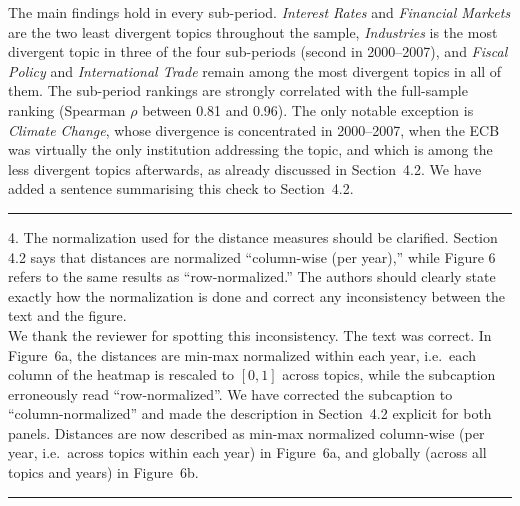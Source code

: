 \documentclass{report}
\theoremstyle{plain}
\begin{document}
{The main findings hold in every sub-period. \textit{Interest Rates} and \textit{Financial Markets} are the two least divergent topics throughout the sample, \textit{Industries} is the most divergent topic in three of the four sub-periods (second in 2000--2007), and \textit{Fiscal Policy} and \textit{International Trade} remain among the most divergent topics in all of them. The sub-period rankings are strongly correlated with the full-sample ranking (Spearman $\rho$ between 0.81 and 0.96). The only notable exception is \textit{Climate Change}, whose divergence is concentrated in 2000--2007, when the ECB was virtually the only institution addressing the topic, and which is among the less divergent topics afterwards, as already discussed in Section~4.2. We have added a sentence summarising this check to Section~4.2.
}
\\
\noindent\rule{15cm}{0.4pt}

4. The normalization used for the distance measures should be clarified. Section 4.2 says that distances are normalized ``column-wise (per year),'' while Figure 6 refers to the same results as ``row-normalized.'' The authors should clearly state exactly how the normalization is done and correct any inconsistency between the text and the figure.
\\
{\color{orange}
We thank the reviewer for spotting this inconsistency. The text was correct. In Figure~6a, the distances are min-max normalized within each year, i.e.\ each column of the heatmap is rescaled to $[0,1]$ across topics, while the subcaption erroneously read ``row-normalized''. We have corrected the subcaption to ``column-normalized'' and made the description in Section~4.2 explicit for both panels. Distances are now described as min-max normalized column-wise (per year, i.e.\ across topics within each year) in Figure~6a, and globally (across all topics and years) in Figure~6b.
}
\\
\noindent\rule{15cm}{0.4pt}
\end{document}
